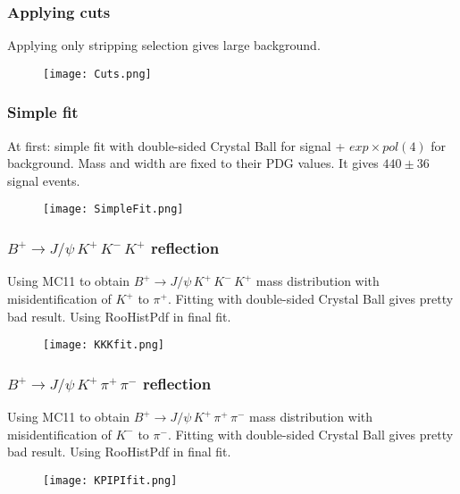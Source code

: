 \documentclass{beamer}
\begin{document}


\begin{frame}
\frametitle{Applying cuts}
Applying only stripping selection gives large background.

\begin{figure}
\texttt{[image: Cuts.png]}
\end{figure}
\end{frame}



\begin{frame}
\frametitle{Simple fit}
At first: simple fit with double-sided Crystal Ball for signal + $exp \times pol(4)$ for background. Mass and width are fixed to their PDG values. It gives $440 \pm 36$ signal events.

\begin{figure}
\texttt{[image: SimpleFit.png]}
\end{figure}
\end{frame}




\begin{frame}
\frametitle{$B^+ \to J/\psi \, K^+ \, K^- \, K^+$ reflection}
Using MC11 to obtain $B^+ \to J/\psi \, K^+ \, K^- \, K^+$ mass distribution with misidentification of $K^+$ to $\pi^+$.
Fitting with double-sided Crystal Ball gives pretty bad result. Using RooHistPdf in final fit.

\begin{figure}
\texttt{[image: KKKfit.png]}
\end{figure}
\end{frame}



\begin{frame}
\frametitle{$B^+ \to J/\psi \, K^+ \, \pi^+ \, \pi^-$ reflection}
Using MC11 to obtain $B^+ \to J/\psi \, K^+ \, \pi^+ \, \pi^-$ mass distribution with misidentification of $K^-$ to $\pi^-$.
Fitting with double-sided Crystal Ball gives pretty bad result. Using RooHistPdf in final fit.

\begin{figure}
\texttt{[image: KPIPIfit.png]}
\end{figure}
\end{frame}


\end{document}
